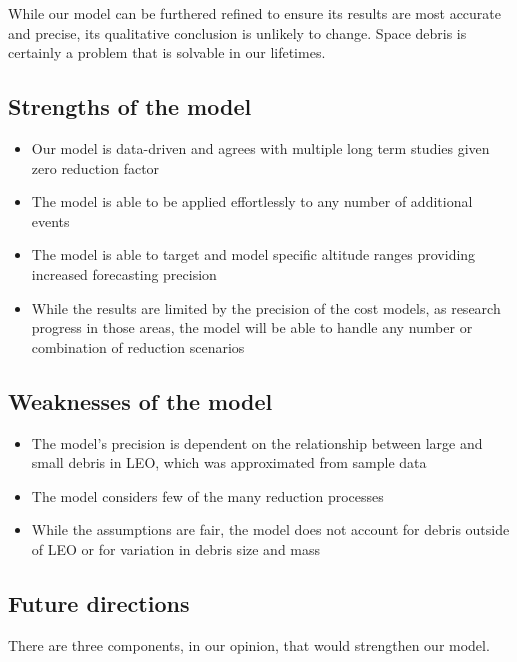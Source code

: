 \documentclass[pre,12pt]{revtex4-1}
\begin{document}
While our model can be furthered refined to ensure its results are most accurate and precise, its qualitative conclusion is unlikely to change. Space debris is certainly a problem that is solvable in our lifetimes.

\subsection{Strengths of the model}

\begin{itemize}
	\item Our model is data-driven and agrees with multiple long term studies given zero reduction factor
	\item The model is able to be applied effortlessly to any number of additional events
	\item The model is able to target and model specific altitude ranges providing increased forecasting precision
	\item While the results are limited by the precision of the cost models, as research progress in those areas, the model will be able to handle any number or combination of reduction scenarios
\end{itemize}
 

\subsection{Weaknesses of the model}

\begin{itemize}
	\item The model's precision is dependent on the relationship between large and small debris in LEO, which was approximated from sample data
	\item The model considers few of the many reduction processes
	\item While the assumptions are fair, the model does not account for debris outside of LEO or for variation in debris size and mass 
\end{itemize}

\subsection{Future directions}


There are three components, in our opinion, that would strengthen our model.
\end{document}
